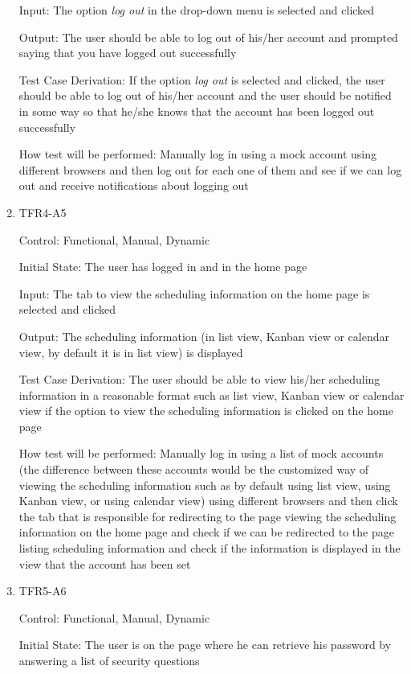 \documentclass[12pt, titlepage]{article}
\begin{document}
\begin{enumerate}
  Input: The option \textit{log out} in the drop-down menu is selected and clicked
            
  Output: The user should be able to log out of his/her account and prompted saying that you have logged out successfully
  
  Test Case Derivation: If the option \textit{log out} is selected and clicked, the user should be able to log out of his/her account and the user should be notified in some way so that he/she knows that the account has been logged out successfully
  
  How test will be performed: Manually log in using a mock account using different browsers and then log out for each one of them and see if we can log out and receive notifications about logging out
  \item{TFR4-A5\\}
  
  Control: Functional, Manual, Dynamic
            
  Initial State: The user has logged in and in the home page
            
  Input:  The tab to view the scheduling information on the home page is selected and clicked
            
  Output: The scheduling information (in list view, Kanban view or calendar view, by default it is in list view) is displayed
  
  Test Case Derivation: The user should be able to view his/her scheduling information in a reasonable format such as list view, Kanban view or calendar view if the option to view the scheduling information is clicked on the home page
            
  How test will be performed: Manually log in using a list of mock accounts (the difference between these accounts would be the customized way of viewing the scheduling information such as by default using list view, using Kanban view, or using calendar view) using different browsers and then click the tab that is responsible for redirecting to the page viewing the scheduling information on the home page and check if we can be redirected to the page listing scheduling information and check if the information is displayed in the view that the account has been set
  
  \item{TFR5-A6\\}
  
  Control: Functional, Manual, Dynamic
            
  Initial State: The user is on the page where he can retrieve his password by answering a list of security questions
            

\end{enumerate}
\end{document}
